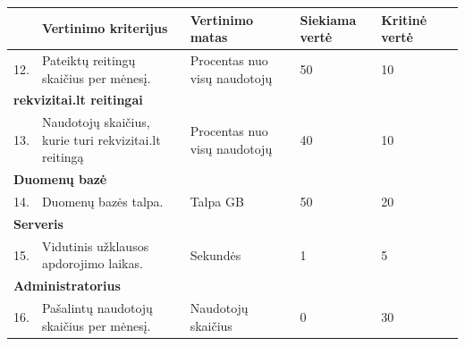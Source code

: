 \documentclass{VUMIFPSkursinis}
\begin{document}
\begin{table}[H]
\centering
\normalsize
\begin{tabular}{|p{0.6cm}|p{6cm}|p{2cm}|p{1.4cm}|p{1.6cm}|p{1.5cm}|}
\hline
\rowcolor{gray!40}

\multicolumn{1}{|m{0.6cm}|}{\textbf{NR.}}&\multicolumn{1}{m{6cm}|}{\textbf{Vertinimo kriterijus}}&\multicolumn{1}{m{3cm}|}{\textbf{Vertinimo matas}}&\multicolumn{1}{m{1.6cm}|}{\textbf{Siekiama vertė}}&\multicolumn{1}{m{1.5cm}|}{\textbf{Kritinė vertė}}\\ \hline

\multicolumn{1}{|m{0.6cm}|}{12.}&\multicolumn{1}{m{6cm}|}{Pateiktų reitingų skaičius per mėnesį.}&\multicolumn{1}{m{3cm}|}{Procentas nuo visų naudotojų}&\multicolumn{1}{m{1.6cm}|}{50}&\multicolumn{1}{m{1.5cm}|}{10}\\ \hline

\multicolumn{5}{|l|}{\textbf{rekvizitai.lt reitingai}} \\ \hline

\multicolumn{1}{|m{0.6cm}|}{13.}&\multicolumn{1}{m{6cm}|}{Naudotojų skaičius, kurie turi rekvizitai.lt reitingą}&\multicolumn{1}{m{3cm}|}{Procentas nuo visų naudotojų}&\multicolumn{1}{m{1.6cm}|}{40}&\multicolumn{1}{m{1.5cm}|}{10}\\ \hline

\multicolumn{5}{|l|}{\textbf{Duomenų bazė}} \\ \hline

\multicolumn{1}{|m{0.6cm}|}{14.}&\multicolumn{1}{m{6cm}|}{Duomenų bazės talpa.}&\multicolumn{1}{m{3cm}|}{Talpa GB}&\multicolumn{1}{m{1.6cm}|}{50}&\multicolumn{1}{m{1.5cm}|}{20}\\ \hline

\multicolumn{5}{|l|}{\textbf{Serveris}} \\ \hline

\multicolumn{1}{|m{0.6cm}|}{15.}&\multicolumn{1}{m{6cm}|}{Vidutinis užklausos apdorojimo laikas.}&\multicolumn{1}{m{3cm}|}{Sekundės}&\multicolumn{1}{m{1.6cm}|}{1}&\multicolumn{1}{m{1.5cm}|}{5}\\ \hline

\multicolumn{5}{|l|}{\textbf{Administratorius}} \\ \hline

\multicolumn{1}{|m{0.6cm}|}{16.}&\multicolumn{1}{m{6cm}|}{Pašalintų naudotojų skaičius per mėnesį.}&\multicolumn{1}{m{3cm}|}{Naudotojų skaičius}&\multicolumn{1}{m{1.6cm}|}{0}&\multicolumn{1}{m{1.5cm}|}{30}\\ \hline


\end{tabular}
\end{table}
\end{document}

